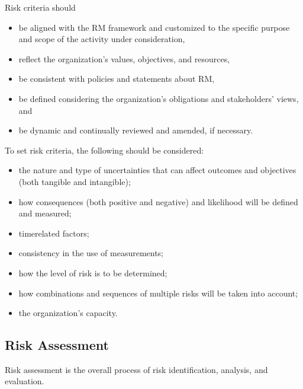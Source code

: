 \documentclass[letterpaper,10pt,english]{jupyterBook}
\begin{document}
\sphinxAtStartPar
Risk criteria should
\begin{itemize}
\item {} 
\sphinxAtStartPar
be aligned with the RM framework and customized to the specific purpose and scope of the activity under consideration,

\item {} 
\sphinxAtStartPar
reflect the organization’s values, objectives, and resources,

\item {} 
\sphinxAtStartPar
be consistent with policies and statements about RM,

\item {} 
\sphinxAtStartPar
be defined considering the organization’s obligations and stakeholders’ views, and

\item {} 
\sphinxAtStartPar
be dynamic and continually reviewed and amended, if necessary.

\end{itemize}

\sphinxAtStartPar
To set risk criteria, the following should be considered:
\begin{itemize}
\item {} 
\sphinxAtStartPar
the nature and type of uncertainties that can affect outcomes and objectives (both tangible and intangible);

\item {} 
\sphinxAtStartPar
how consequences (both positive and negative) and likelihood will be defined and measured;

\item {} 
\sphinxAtStartPar
time\sphinxhyphen{}related factors;

\item {} 
\sphinxAtStartPar
consistency in the use of measurements;

\item {} 
\sphinxAtStartPar
how the level of risk is to be determined;

\item {} 
\sphinxAtStartPar
how combinations and sequences of multiple risks will be taken into account;

\item {} 
\sphinxAtStartPar
the organization’s capacity.

\end{itemize}


\subsection{Risk Assessment}
\label{\detokenize{PM/rm:risk-assessment}}
\sphinxAtStartPar
Risk assessment is the overall process of risk identification, analysis, and evaluation.
\end{document}
